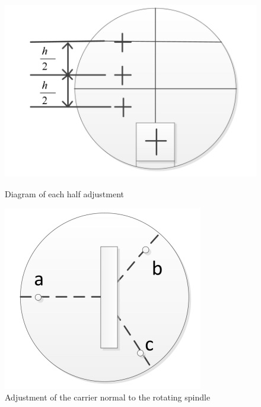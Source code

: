 \documentclass[UTF8]{article}
\begin{document}
     \begin{figure}[H]
                          			\begin{minipage}[t]{0.5\linewidth}
                          				\centering
                          				\includegraphics[clip,scale=1.0,trim={0 0 0 0}]{fig/fig15.png}
                          				\caption{ Diagram of each half adjustment}
                          				\label{figure.15}
                          			\end{minipage}
                          			\begin{minipage}[t]{0.5\linewidth}
                          				\centering
                          				\includegraphics[clip,scale=1,trim={0 0 0 0}]{fig/fig16.png}
                          				\caption{Adjustment of the carrier normal to the rotating spindle}
                          				\label{figure.16}
                          			\end{minipage}
                          		\end{figure}        
\end{document}
